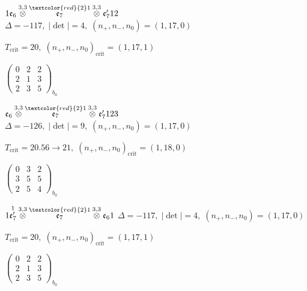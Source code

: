 \documentclass[10pt]{article}
\begin{document}
$1\mathfrak{e}_6\overset{3,3}{\otimes}\overset{\textcolor{red}{2}1}{\mathfrak{e}_7}\overset{3,3}{\otimes}\mathfrak{e}_7'12$ \quad $\Delta=-117,\; |\det|=4,\; (n_+,n_-,n_0)=(1,17,0)$

\hspace{1em}$T_{\text{crit}}=20,\; (n_+,n_-,n_0)_{\text{crit}}=(1,17,1)$

\hspace{2em}$\left(\begin{smallmatrix}0 & 2 & 2 \\ 2 & 1 & 3 \\ 2 & 3 & 5\end{smallmatrix}\right)_{\!b_0}$

\smallskip

$\mathfrak{e}_6\overset{3,3}{\otimes}\overset{\textcolor{red}{2}1}{\mathfrak{e}_7}\overset{3,3}{\otimes}\mathfrak{e}_7'123$ \quad $\Delta=-126,\; |\det|=9,\; (n_+,n_-,n_0)=(1,17,0)$

\hspace{1em}$T_{\text{crit}}=20.56 \to 21,\; (n_+,n_-,n_0)_{\text{crit}}=(1,18,0)$

\hspace{2em}$\left(\begin{smallmatrix}0 & 3 & 2 \\ 3 & 5 & 5 \\ 2 & 5 & 4\end{smallmatrix}\right)_{\!b_0}$

\smallskip

$1\overset{1}{\mathfrak{e}_7'}\overset{3,3}{\otimes}\overset{\textcolor{red}{2}1}{\mathfrak{e}_7}\overset{3,3}{\otimes}\mathfrak{e}_61$ \quad $\Delta=-117,\; |\det|=4,\; (n_+,n_-,n_0)=(1,17,0)$

\hspace{1em}$T_{\text{crit}}=20,\; (n_+,n_-,n_0)_{\text{crit}}=(1,17,1)$

\hspace{2em}$\left(\begin{smallmatrix}0 & 2 & 2 \\ 2 & 1 & 3 \\ 2 & 3 & 5\end{smallmatrix}\right)_{\!b_0}$

\smallskip
\end{document}
